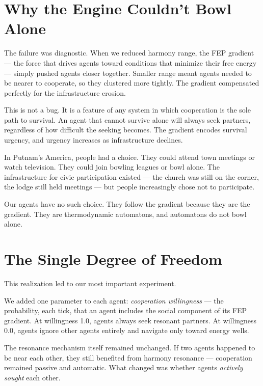 \section{Why the Engine Couldn't Bowl Alone}\label{why-the-engine-couldnt-bowl-alone}

The failure was diagnostic. When we reduced harmony range, the FEP gradient --- the force that drives agents toward conditions that minimize their free energy --- simply pushed agents closer together. Smaller range meant agents needed to be nearer to cooperate, so they clustered more tightly. The gradient compensated perfectly for the infrastructure erosion.

This is not a bug. It is a feature of any system in which cooperation is the sole path to survival. An agent that cannot survive alone will always seek partners, regardless of how difficult the seeking becomes. The gradient encodes survival urgency, and urgency increases as infrastructure declines.

In Putnam's America, people had a choice. They could attend town meetings or watch television. They could join bowling leagues or bowl alone. The infrastructure for civic participation existed --- the church was still on the corner, the lodge still held meetings --- but people increasingly chose not to participate.

Our agents have no such choice. They follow the gradient because they are the gradient. They are thermodynamic automatons, and automatons do not bowl alone.

\section{The Single Degree of Freedom}\label{the-single-degree-of-freedom}

This realization led to our most important experiment.

We added one parameter to each agent: \emph{cooperation willingness} --- the probability, each tick, that an agent includes the social component of its FEP gradient. At willingness 1.0, agents always seek resonant partners. At willingness 0.0, agents ignore other agents entirely and navigate only toward energy wells.

The resonance mechanism itself remained unchanged. If two agents happened to be near each other, they still benefited from harmony resonance --- cooperation remained passive and automatic. What changed was whether agents \emph{actively sought} each other.

